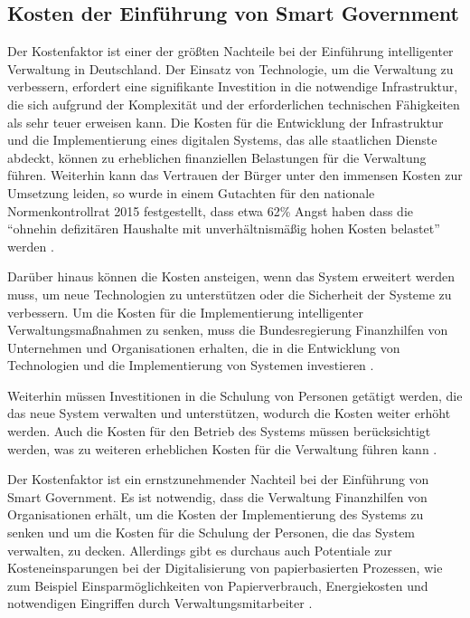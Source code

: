 \subsection{Kosten der Einführung von Smart Government}
Der Kostenfaktor ist einer der größten Nachteile bei der Einführung intelligenter Verwaltung in Deutschland.
Der Einsatz von Technologie, um die Verwaltung zu verbessern, erfordert eine signifikante Investition in die notwendige Infrastruktur, die sich aufgrund der Komplexität und der erforderlichen technischen Fähigkeiten als sehr teuer erweisen kann.
Die Kosten für die Entwicklung der Infrastruktur und die Implementierung eines digitalen Systems, das alle staatlichen Dienste abdeckt, können zu erheblichen finanziellen Belastungen für die Verwaltung führen.
Weiterhin kann das Vertrauen der Bürger unter den immensen Kosten zur Umsetzung leiden, so wurde in einem Gutachten für den nationale Normenkontrollrat 2015 festgestellt, dass etwa 62\% Angst haben dass die ``ohnehin defizitären Haushalte mit unverhältnismäßig hohen Kosten belastet'' werden \citep[][S. 16]{NationalenNormenkontrollrat2015}.
\par
Darüber hinaus können die Kosten ansteigen, wenn das System erweitert werden muss, um neue Technologien zu unterstützen oder die Sicherheit der Systeme zu verbessern.
Um die Kosten für die Implementierung intelligenter Verwaltungsmaßnahmen zu senken, muss die Bundesregierung Finanzhilfen von Unternehmen und Organisationen erhalten, die in die Entwicklung von Technologien und die Implementierung von Systemen investieren \citep[][S. 51]{NationalenNormenkontrollrat2015}.
\par
Weiterhin müssen Investitionen in die Schulung von Personen getätigt werden, die das neue System verwalten und unterstützen, wodurch die Kosten weiter erhöht werden.
Auch die Kosten für den Betrieb des Systems müssen berücksichtigt werden, was zu weiteren erheblichen Kosten für die Verwaltung führen kann \citep[][S. 52, 88]{NationalenNormenkontrollrat2015}.
\par
Der Kostenfaktor ist ein ernstzunehmender Nachteil bei der Einführung von Smart Government.
Es ist notwendig, dass die Verwaltung Finanzhilfen von Organisationen erhält, um die Kosten der Implementierung des Systems zu senken und um die Kosten für die Schulung der Personen, die das System verwalten, zu decken.
Allerdings gibt es durchaus auch Potentiale zur Kosteneinsparungen bei der Digitalisierung von papierbasierten Prozessen, wie zum Beispiel Einsparmöglichkeiten von Papierverbrauch, Energiekosten und notwendigen Eingriffen durch Verwaltungsmitarbeiter \citep[Vgl.][S.179]{von_Lucke_2016}.